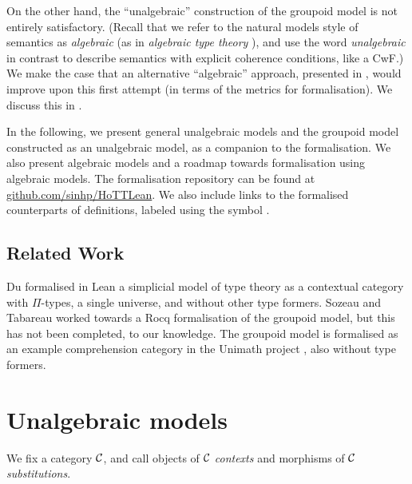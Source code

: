 On the other hand,
the ``unalgebraic'' construction of the groupoid model is
not entirely satisfactory.
(Recall that we refer to the natural models style of semantics as \emph{algebraic}
(as in \emph{algebraic type theory} \cite{awodey2025}),
and use the word \emph{unalgebraic} in contrast
to describe semantics with explicit coherence conditions, like a CwF.)
We make the case that an alternative ``algebraic'' approach,
presented in ,
would improve upon this first attempt
(in terms of the metrics for formalisation).
We discuss this in .

In the following, we present general unalgebraic models
and the groupoid model constructed as an unalgebraic model,
as a companion to the formalisation.
We also present algebraic models and a roadmap towards formalisation
using algebraic models.
The formalisation repository can be found at
\href{https://github.com/sinhp/HoTTLean/tree/HoTTUF}{\textsf{github.com/sinhp/HoTTLean}}.
We also include links to the
formalised counterparts of definitions,
labeled using the symbol .

\subsection*{Related Work}
Du \cite{du2025} formalised in Lean a simplicial model
of type theory as a contextual category with $\Pi$-types,
a single universe, and without other type formers.
Sozeau and Tabareau \cite{sozeau2014} worked towards a Rocq formalisation
of the groupoid model,
but this has not been completed, to our knowledge.
The groupoid model is formalised as an example comprehension category
in the Unimath project \cite{2024grayson},
also without type formers.

\section{Unalgebraic models}\label{sec:UnstrSem}
We fix a category $\mathcal{C}$,
and call objects of $\mathcal{C}$ \emph{contexts} and
morphisms of $\mathcal{C}$ \emph{substitutions}. 


